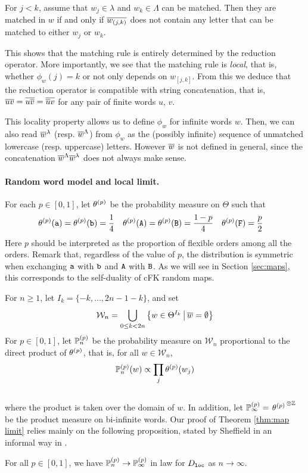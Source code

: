 \documentclass[a4paper]{article}
\newcommand*{\W}{\mathcal{W}}
\begin{document}
\begin{prop}\label{prop:local}
For $j<k$, assume that $w_j\in\lambda$ and $w_k\in\Lambda$ can be matched.
Then they are matched in $w$ if and only if $\overline{w_{(j,k)}}$ does not contain any letter that can be matched to either $w_j$ or $w_k$.
\end{prop}
\noindent
This shows that the matching rule is entirely determined by the reduction operator.
More importantly, we see that the matching rule is \emph{local}, that is, whether $\phi_w(j)=k$ or not only depends on $w_{[j,k]}$.
From this we deduce that the reduction operator is compatible with string concatenation, that is, $\overline{uv} = \overline{u\overline{v}} = \overline{\overline{u}v}$ for any pair of finite words $u$, $v$.

This locality property allows us to define $\phi_w$ for infinite words $w$.
Then, we can also read $\overline{w}^\lambda$ (resp. $\overline{w}^\Lambda$) from $\phi_w$ as the (possibly infinite) sequence of unmatched lowercase (resp. uppercase) letters.
However $\overline{w}$ is not defined in general, since the concatenation $\overline{w}^\Lambda\overline{w}^\lambda$ does not always make sense.

\paragraph{Random word model and local limit.}
For each $p\in[0,1]$, let $\theta^{(p)}$ be the probability measure on $\Theta$ such that
\begin{align*}
	\theta^{(p)}(\mathtt{a}) &= \theta^{(p)}(\mathtt{b}) = \frac{1}{4}		&
	\theta^{(p)}(\mathtt{A}) &= \theta^{(p)}(\mathtt{B}) = \frac{1-p}{4}	&
	\theta^{(p)}(\mathtt{F}) &= \frac{p}{2}
\end{align*}
Here $p$ should be interpreted as the proportion of flexible orders among all the orders.
Remark that, regardless of the value of $p$, the distribution is symmetric when exchanging $\mathtt{a}$ with $\mathtt{b}$ and $\mathtt{A}$ with $\mathtt{B}$.
As we will see in Section \ref{sec:maps}, this corresponds to the self-duality of cFK random maps.

For $n\geq 1$, let $I_k = \{-k,\ldots,2n-1-k\}$, and set
\begin{equation}
\W_n = \bigcup_{0\leq k<2n} \set{w\in \Theta^{I_k} }{\rd{w} = \emptystr}
\end{equation}
For $p\in [0,1]$, let $\mathbb{P}^{(p)}_n$ be the probability measure on $\W_n$ proportional to the direct product of $\theta^{(p)}$, that is, for all $w\in\W_n$,
\begin{equation}
	\mathbb{P}^{(p)}_n(w) \propto \prod_{j} \theta^{(p)}(w_j)
\end{equation}\vspace{-0.7ex}\\
where the product is taken over the domain of $w$.
In addition, let $\mathbb{P}^{(p)}_\infty = \left.\theta^{(p)}\right.^{\otimes\mathbb{Z}}$ be the product measure on bi-infinite words. Our proof of Theorem \ref{thm:map limit} relies mainly on the following proposition, stated by Sheffield in an informal way in \cite{She11}.
\begin{prop} \label{prop:word limit}
For all $p\in[0,1]$, we have $\mathbb{P}^{(p)}_n \to \mathbb{P}^{(p)}_\infty$ in law for $D_{\mathtt{loc}}$ as $n \to \infty$.
\end{prop}
\end{document}
